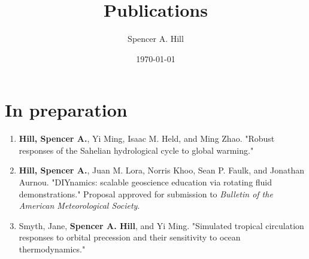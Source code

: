 \documentclass[12pt,letterpaper]{shillcv}
\author{Spencer A. Hill}
\date{\today}
\title{Publications}
\begin{document}
\maketitle
\section*{In preparation}
\label{sec:org51dab71}
\begin{enumerate}
\item \textbf{Hill, Spencer A.}, Yi Ming, Isaac M. Held, and Ming Zhao.  "Robust responses
of the Sahelian hydrological cycle to global warming."
\item \textbf{Hill, Spencer A.}, Juan M. Lora, Norris Khoo, Sean P. Faulk, and Jonathan
Aurnou.  "DIYnamics: scalable geoscience education via rotating fluid
demonstrations."  Proposal approved for submission to \emph{Bulletin of the
American Meteorological Society}.
\item Smyth, Jane, \textbf{Spencer A. Hill}, and Yi Ming.  "Simulated tropical circulation
responses to orbital precession and their sensitivity to ocean
thermodynamics."
\end{enumerate}
\end{document}
